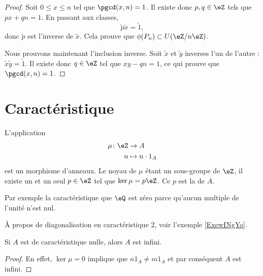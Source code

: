 \begin{proof}
    Soit \( 0\leq x\leq n\) tel que \( \pgcd(x,n)=1\). Il existe donc \( p,q\in\eZ\) tels que \( px+qn=1\). En passant aux classes,
    \begin{equation}
        \tilde p\tilde x=\tilde 1,
    \end{equation}
    donc \( \tilde p\) est l'inverse de \( \tilde x\). Cela prouve que \( \phi(P_n)\subset U(\eZ/n\eZ)\).

    Nous prouvons maintenant l'inclusion inverse. Soit \( \tilde x\) et \( \tilde y\) inverses l'un de l'autre : $\tilde x\tilde y=\tilde 1$. Il existe donc \( q\in\eZ\) tel que \( xy-qn=1\), ce qui prouve que \( \pgcd(x,n)=1\).
\end{proof}

\section{Caractéristique}

L'application 
\begin{equation}
    \begin{aligned}
        \mu\colon \eZ&\to A \\
        n&\mapsto n\cdot 1_A 
    \end{aligned}
\end{equation}
est un morphisme d'anneaux. Le noyau de \( \mu\) étant un sous-groupe de \( \eZ\), il existe un et un seul \( p\in\eZ\) tel que \( \ker\mu=p\eZ\). Ce \( p\) est la  de \( A\).

Par exemple la caractéristique que \( \eQ\) est zéro parce qu'aucun multiple de l'unité n'est nul.

À propos de diagonalisation en caractéristique \( 2\), voir l'exemple \ref{ExewINgYo}.

\begin{lemma}
    Si \( A\) est de caractéristique nulle, alors \( A\) est infini.
\end{lemma}

\begin{proof}
    En effet, \( \ker\mu=0\) implique que \( n1_A\neq  m1_A\) et par conséquent \( A\) est infini.
\end{proof}

